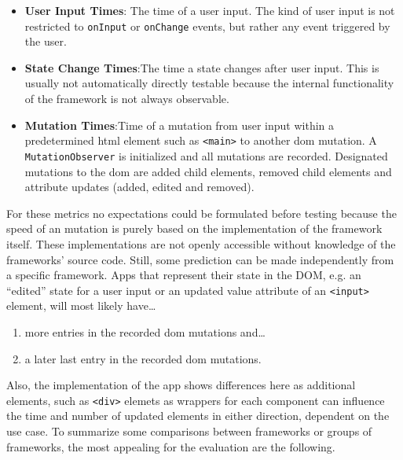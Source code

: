 \documentclass[a4paper, 10pt]{article}
\begin{document}
\begin{itemize}
  \item \textbf{User Input Times}: The time of a user input.
  The kind of user input is not restricted to \verb|onInput| or \verb|onChange| events, but rather any event triggered by the user.
  \item \textbf{State Change Times}:The time a state changes after user input.
  This is usually not automatically directly testable because the internal functionality of the framework is not always observable.
  \item \textbf{Mutation Times}:Time of a mutation from user input within a predetermined \acrshort{html} element such as \verb|<main>| to another \acrshort{dom} mutation.
  A \verb|MutationObserver| is initialized and all mutations are recorded. Designated mutations to the \acrshort{dom} are added child elements, removed child elements and attribute updates (added, edited and removed).
\end{itemize}

For these metrics no expectations could be formulated before testing because the speed of an mutation is purely based on the implementation of the framework itself.
These implementations are not openly accessible without knowledge of the frameworks' source code.
Still, some prediction can be made independently from a specific framework.
Apps that represent their state in the DOM, e.g. an \enquote{edited} state for a user input or an updated value attribute of an \verb|<input>| element, will most likely have\dots

\begin{enumerate}
  \item more entries in the recorded \acrshort{dom} mutations and\dots
  \item a later last entry in the recorded \acrshort{dom} mutations.
\end{enumerate}

Also, the implementation of the app shows differences here as additional elements, such as \verb|<div>| elemets as wrappers for each component can influence the time and number of updated elements in either direction, dependent on the use case.
To summarize some comparisons between frameworks or groups of frameworks, the most appealing for the evaluation are the following.
\end{document}
